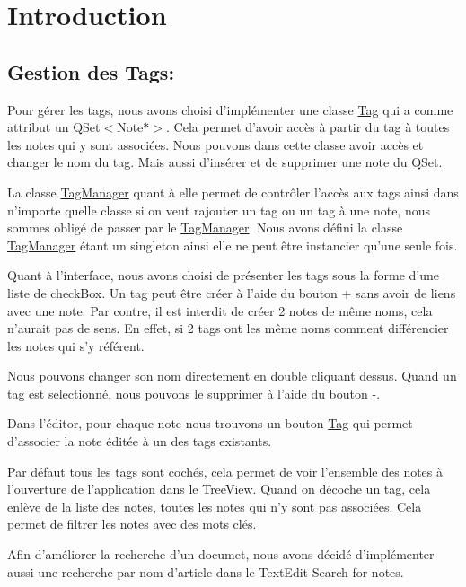 \hypertarget{index_Introduction}{}\section{Introduction}\label{index_Introduction}
\hypertarget{index_Gestion}{}\subsection{Gestion des Tags\-:}\label{index_Gestion}
Pour gérer les tags, nous avons choisi d'implémenter une classe \hyperlink{class_tag}{Tag} qui a comme attribut un Q\-Set$<$\-Note$\ast$$>$. Cela permet d'avoir accès à partir du tag à toutes les notes qui y sont associées. Nous pouvons dans cette classe avoir accès et changer le nom du tag. Mais aussi d'insérer et de supprimer une note du Q\-Set.

La classe \hyperlink{class_tag_manager}{Tag\-Manager} quant à elle permet de contrôler l'accès aux tags ainsi dans n'importe quelle classe si on veut rajouter un tag ou un tag à une note, nous sommes obligé de passer par le \hyperlink{class_tag_manager}{Tag\-Manager}. Nous avons défini la classe \hyperlink{class_tag_manager}{Tag\-Manager} étant un singleton ainsi elle ne peut être instancier qu'une seule fois.

Quant à l'interface, nous avons choisi de présenter les tags sous la forme d'une liste de check\-Box. Un tag peut être créer à l'aide du bouton + sans avoir de liens avec une note. Par contre, il est interdit de créer 2 notes de même noms, cela n'aurait pas de sens. En effet, si 2 tags ont les même noms comment différencier les notes qui s'y référent.

Nous pouvons changer son nom directement en double cliquant dessus. Quand un tag est selectionné, nous pouvons le supprimer à l'aide du bouton -\/.

Dans l'éditor, pour chaque note nous trouvons un bouton \hyperlink{class_tag}{Tag} qui permet d'associer la note éditée à un des tags existants.

Par défaut tous les tags sont cochés, cela permet de voir l'ensemble des notes à l'ouverture de l'application dans le Tree\-View. Quand on décoche un tag, cela enlève de la liste des notes, toutes les notes qui n'y sont pas associées. Cela permet de filtrer les notes avec des mots clés.

Afin d'améliorer la recherche d'un documet, nous avons décidé d'implémenter aussi une recherche par nom d'article dans le Text\-Edit Search for notes.

